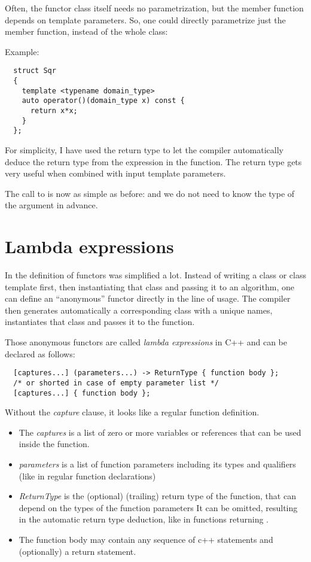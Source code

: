 Often, the functor class itself needs no parametrization, but the member function  depends on template parameters. So,
one could directly parametrize just the member function, instead of the whole class:

Example:
\begin{verbatim}
  struct Sqr
  {
    template <typename domain_type>
    auto operator()(domain_type x) const {
      return x*x;
    }
  };
\end{verbatim}
%
For simplicity, I have used the return type  to let the compiler automatically deduce the return type from the expression in the
function. The  return type gets very useful when combined with input template parameters.

The call to  is now as simple as before:
and we do not need to know the type of the argument in advance.


\section{Lambda expressions}
In \marginpar{[\cxx{11}]} the definition of functors was simplified a lot. Instead of writing a class or class template first, then instantiating that
class and passing it to an algorithm, one can define an ``anonymous'' functor directly in the line of usage. The compiler then generates automatically
a corresponding class with a unique names, instantiates that class and passes it to the function.

Those anonymous functors are called \emph{lambda expressions} in C++ and can be declared as follows:
%
\begin{verbatim}
  [captures...] (parameters...) -> ReturnType { function body };
  /* or shorted in case of empty parameter list */
  [captures...] { function body };
\end{verbatim}
%
Without the \emph{capture} clause, it looks like a regular function definition.
\begin{itemize}
  \item The \emph{captures} is a list of zero or more variables or references that can be used inside the function.
  \item \emph{parameters} is a list of function parameters including its types and qualifiers (like in regular function declarations)
  \item \emph{ReturnType} is the (optional) (trailing) return type of the function, that can depend on the types of the function parameters
        It can be omitted, resulting in the automatic return type deduction, like in functions returning .
  \item The function body may contain any sequence of c++ statements and (optionally) a return statement.
\end{itemize}

